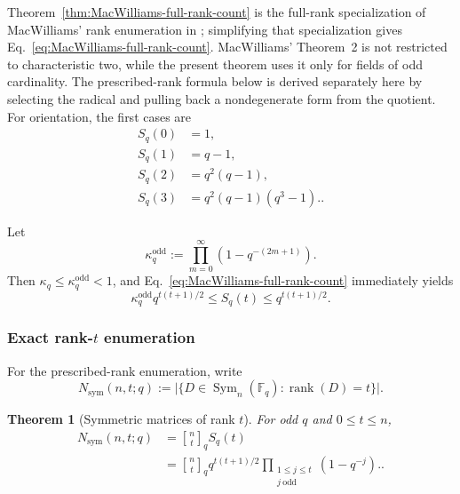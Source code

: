 \documentclass[11pt]{article}
\newcommand{\F}{\mathbb F}
\newcommand{\Sym}{\operatorname{Sym}}
\newcommand{\rank}{\operatorname{rank}}
\newcommand{\1}{\mathbf 1}
\theoremstyle{plain}
\newtheorem{theorem}{Theorem}[section]
\theoremstyle{definition}
\theoremstyle{remark}
\begin{document}
Theorem~\ref{thm:MacWilliams-full-rank-count} is the full-rank
specialization of MacWilliams' rank enumeration in
\cite[Theorem~2, pp.~154--155]{MacWilliams1969}; simplifying that
specialization gives Eq.~\eqref{eq:MacWilliams-full-rank-count}.  MacWilliams'
Theorem~2 is not restricted to characteristic two, while the present theorem
uses it only for fields of odd cardinality.  The prescribed-rank formula below
is derived separately here by selecting the radical and pulling back a
nondegenerate form from the quotient.  For orientation, the first cases
are
\begin{align}
  S_q(0)&=1,                                                     \label{eq:S-q-zero}\\
  S_q(1)&=q-1,                                                   \label{eq:S-q-one}\\
  S_q(2)&=q^2(q-1),                                             \label{eq:S-q-two}\\
  S_q(3)&=q^2(q-1)(q^3-1).                                     \label{eq:S-q-three}.
\end{align}

Let
\begin{equation}
  \kappa_q^{\mathrm{odd}}
  :=\prod_{m=0}^{\infty}(1-q^{-(2m+1)}).
  \label{eq:kappa-q-odd-definition}
\end{equation}
Then $\kappa_q\le\kappa_q^{\mathrm{odd}}<1$, and
Eq.~\eqref{eq:MacWilliams-full-rank-count} immediately yields
\begin{equation}
  \kappa_q^{\mathrm{odd}}q^{t(t+1)/2}
  \le S_q(t)
  \le q^{t(t+1)/2}.
  \label{eq:nonsingular-symmetric-uniform-bounds}
\end{equation}

\subsubsection{Exact rank-\texorpdfstring{$t$}{t} enumeration}
\label{appsubsec:exact-rank-t-enumeration}

For the prescribed-rank enumeration, write
\begin{equation}
  N_{\mathrm{sym}}(n,t;q)
  :=\lvert\{D\in\Sym_n(\F_q):\rank(D)=t\}\rvert.
  \label{eq:rank-t-symmetric-count-q}
\end{equation}

\begin{theorem}[Symmetric matrices of rank \texorpdfstring{$t$}{t}]
\label{thm:exact-symmetric-rank-count}
For odd $q$ and $0\le t\le n$,
\begin{align}
  N_{\mathrm{sym}}(n,t;q)
  &=\genfrac{[}{]}{0pt}{}{n}{t}_q S_q(t)                                       \label{eq:rank-t-count-quotient-form}\\
  &=\genfrac{[}{]}{0pt}{}{n}{t}_q q^{t(t+1)/2}
    \prod_{\substack{1\le j\le t\\j\ \mathrm{odd}}}
    (1-q^{-j}).                                                  \label{eq:rank-t-count-exact}.
\end{align}
\end{theorem}
\end{document}
